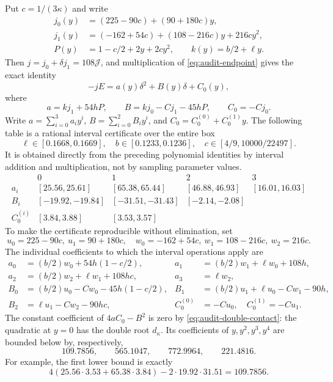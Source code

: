\documentclass[11pt,a4paper]{article}
\numberwithin{equation}{section}
\theoremstyle{remark}
\begin{document}
Put \(c=1/(3\kappa)\) and write
\[
\begin{aligned}
 j_0(y)&=(225-90c)+(90+180c)y,\\
 j_1(y)&=(-162+54c)+(108-216c)y+216cy^2,\\
 P(y)&=1-c/2+2y+2cy^2,\qquad k(y)=b/2+\ell y.
\end{aligned}
\]
Then \(j=j_0+\delta j_1=108\mathcal J\), and multiplication of
\eqref{eq:audit-endpoint} gives the exact identity
\begin{equation}\label{eq:audit-quadratic-numerator}
 -jE=a(y)\delta^2+B(y)\delta+C_0(y),
\end{equation}
where
\[
 a=kj_1+54hP,\qquad
 B=kj_0-Cj_1-45hP,\qquad C_0=-Cj_0.
\]
Write \(a=\sum_{i=0}^3a_i y^i\),
\(B=\sum_{i=0}^2 B_i y^i\), and \(C_0=C_0^{(0)}+C_0^{(1)}y\).
The following table is a rational interval certificate over the entire box
\[
 \ell\in[0.1668,0.1669],\quad b\in[0.1233,0.1236],\quad
 c\in[4/9,10000/22497].
\]
It is obtained directly from the preceding polynomial identities by
interval addition and multiplication, not by sampling parameter values.
\[
\begin{array}{c|rrrr}
 &0&1&2&3\\ \hline
 a_i &[25.56,25.61]&[65.38,65.44]&[46.88,46.93]&[16.01,16.03]\\
 B_i &[-19.92,-19.84]&[-31.51,-31.43]&[-2.14,-2.08]&\\
 C_0^{(i)} &[3.84,3.88]&[3.53,3.57]&&
\end{array}
\]
To make the certificate reproducible without elimination, set
\[
 u_0=225-90c,\ u_1=90+180c,\quad
 w_0=-162+54c,\ w_1=108-216c,\ w_2=216c.
\]
The individual coefficients to which the interval operations apply are
\[
\begin{aligned}
 a_0&=(b/2)w_0+54h(1-c/2),&
 a_1&=(b/2)w_1+\ell w_0+108h,\\
 a_2&=(b/2)w_2+\ell w_1+108hc,&a_3&=\ell w_2,\\
 B_0&=(b/2)u_0-Cw_0-45h(1-c/2),&
 B_1&=(b/2)u_1+\ell u_0-Cw_1-90h,\\
 B_2&=\ell u_1-Cw_2-90hc,&
 C_0^{(0)}&=-Cu_0,\quad C_0^{(1)}=-Cu_1.
\end{aligned}
\]
The constant coefficient of \(4aC_0-B^2\) is zero by
\eqref{eq:audit-double-contact}: the quadratic at \(y=0\) has the
double root \(d_\kappa\).  Its coefficients of \(y,y^2,y^3,y^4\)
are bounded below by, respectively,
\[
 109.7856,\qquad565.1047,\qquad772.9964,\qquad221.4816.
\]
For example, the first lower bound is exactly
\[
 4(25.56\cdot3.53+65.38\cdot3.84)
       -2\cdot19.92\cdot31.51=109.7856.
\]
\end{document}
